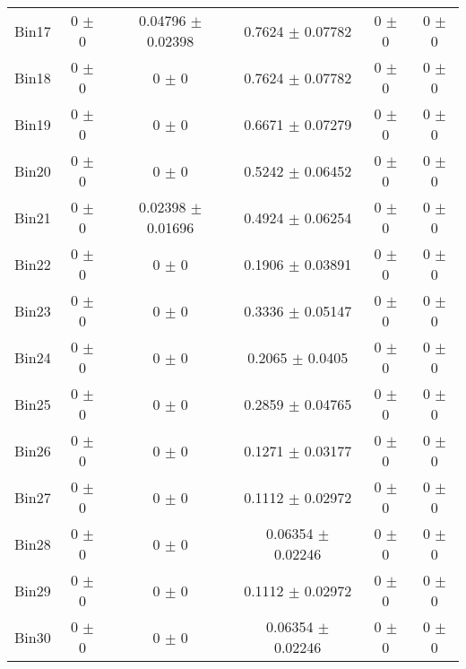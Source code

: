 \begin{tabular}{@{\extracolsep{4pt}}lccccc@{}}
     Bin17 & 0 $\pm$ 0 & 0.04796 $\pm$ 0.02398 & 0.7624 $\pm$ 0.07782 & 0 $\pm$ 0 & 0 $\pm$ 0 \\ 
     Bin18 & 0 $\pm$ 0 & 0 $\pm$ 0 & 0.7624 $\pm$ 0.07782 & 0 $\pm$ 0 & 0 $\pm$ 0 \\ 
     Bin19 & 0 $\pm$ 0 & 0 $\pm$ 0 & 0.6671 $\pm$ 0.07279 & 0 $\pm$ 0 & 0 $\pm$ 0 \\ 
     Bin20 & 0 $\pm$ 0 & 0 $\pm$ 0 & 0.5242 $\pm$ 0.06452 & 0 $\pm$ 0 & 0 $\pm$ 0 \\ 
     Bin21 & 0 $\pm$ 0 & 0.02398 $\pm$ 0.01696 & 0.4924 $\pm$ 0.06254 & 0 $\pm$ 0 & 0 $\pm$ 0 \\ 
     Bin22 & 0 $\pm$ 0 & 0 $\pm$ 0 & 0.1906 $\pm$ 0.03891 & 0 $\pm$ 0 & 0 $\pm$ 0 \\ 
     Bin23 & 0 $\pm$ 0 & 0 $\pm$ 0 & 0.3336 $\pm$ 0.05147 & 0 $\pm$ 0 & 0 $\pm$ 0 \\ 
     Bin24 & 0 $\pm$ 0 & 0 $\pm$ 0 & 0.2065 $\pm$ 0.0405 & 0 $\pm$ 0 & 0 $\pm$ 0 \\ 
     Bin25 & 0 $\pm$ 0 & 0 $\pm$ 0 & 0.2859 $\pm$ 0.04765 & 0 $\pm$ 0 & 0 $\pm$ 0 \\ 
     Bin26 & 0 $\pm$ 0 & 0 $\pm$ 0 & 0.1271 $\pm$ 0.03177 & 0 $\pm$ 0 & 0 $\pm$ 0 \\ 
     Bin27 & 0 $\pm$ 0 & 0 $\pm$ 0 & 0.1112 $\pm$ 0.02972 & 0 $\pm$ 0 & 0 $\pm$ 0 \\ 
     Bin28 & 0 $\pm$ 0 & 0 $\pm$ 0 & 0.06354 $\pm$ 0.02246 & 0 $\pm$ 0 & 0 $\pm$ 0 \\ 
     Bin29 & 0 $\pm$ 0 & 0 $\pm$ 0 & 0.1112 $\pm$ 0.02972 & 0 $\pm$ 0 & 0 $\pm$ 0 \\ 
     Bin30 & 0 $\pm$ 0 & 0 $\pm$ 0 & 0.06354 $\pm$ 0.02246 & 0 $\pm$ 0 & 0 $\pm$ 0 \\ 
\hline\hline
  \end{tabular}
